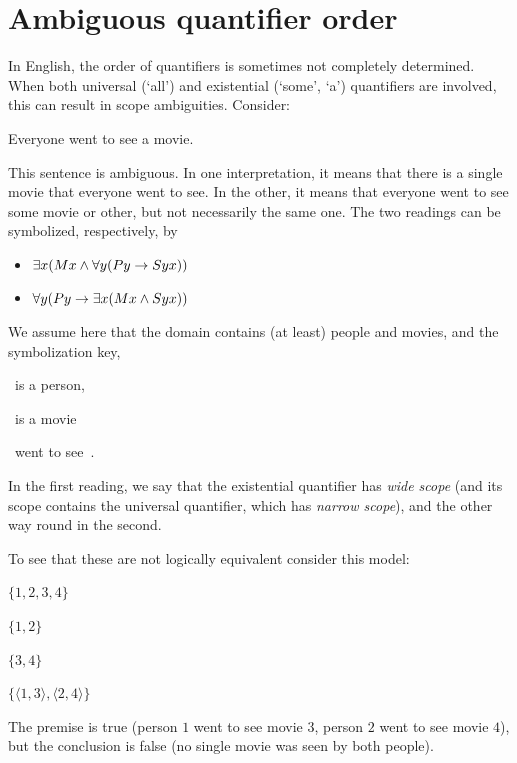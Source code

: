 			\section{Ambiguous quantifier order}
		In English, the order of quantifiers is sometimes not completely determined.  When both universal (`all') and existential (`some', `a') quantifiers are  involved, this can result in scope ambiguities. Consider:
			\begin{samplesent}
				\item\label{sent:everya} Everyone went to see a movie.
			\end{samplesent}
			This sentence is ambiguous.  In one interpretation, it means that there is a single movie that everyone went to see. In the  other, it means that everyone went to see some movie or other, but not necessarily the same one. The two readings can be symbolized, respectively, by
			\begin{itemize}
				\item $\exists x({M}{x} \mathbin{\wedge} \forall y({P}{y} \rightarrow {S}{yx}))$
				\item $\forall y({P}{y} \rightarrow \exists x({M}{x} \mathbin{\wedge} {S}{yx}))$
			\end{itemize}
			We assume here that the domain contains (at least) people and movies, and the symbolization key,
			\begin{ekey}
				\item[{P}{y}] ~is a person,
				\item[{M}{x}] ~is a movie
				\item[{S}{yx}] ~went to see~.
			\end{ekey}
			In the first reading, we say that the existential quantifier has \emph{wide scope} (and its scope contains the universal quantifier, which has \emph{narrow scope}), and the other way round in the second.
			
			To see that these are not logically equivalent consider this model:
			\begin{interp}
				\item[\domain] $\{1,2,3,4\}$
				\item[\denote{P}] $\{1,2\}$
				\item[\denote{M}] $\{3,4\}$
				\item[\denote{W}] $\{\langle 1,3\rangle,\langle 2,4\rangle\}$
			\end{interp}
			The premise is true (person $1$ went to see movie $3$, person $2$ went to see movie $4$), but the conclusion is false (no single movie was seen by both people).
			
